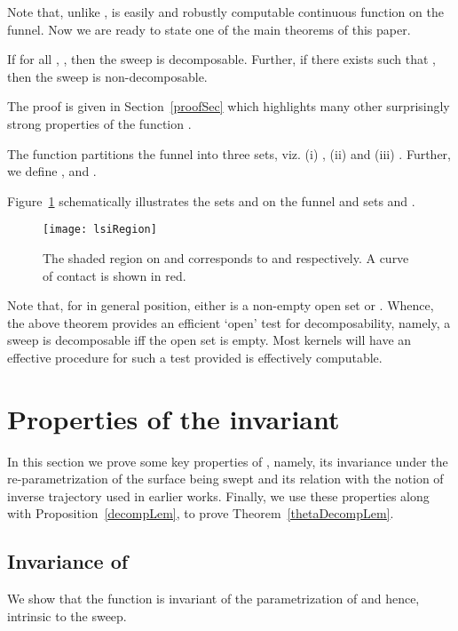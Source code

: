 \documentclass{elsart5p}
\begin{document}
Note that, unlike ,  is easily and robustly computable continuous 
function on the funnel.
Now we are ready to state one of the main theorems of this paper.

\begin{thm} \label{thetaDecompLem}
If for all , , then the sweep is decomposable.  
Further, 
if there exists  such that , then the sweep is 
non-decomposable.
\end{thm}
The proof is given in Section~\ref{proofSec} which highlights
many other surprisingly strong properties of the function .

\begin{defn}
The function  partitions the funnel  into three sets, viz. 
(i) , 
(ii)  and (iii) .  
Further, we define ,  and 
. 
\end{defn}

Figure~\ref{lsiRegionFig} schematically illustrates the sets  and  on the funnel 
and sets  and .

\begin{figure}
 \centering
 \texttt{[image: lsiRegion]}
 \caption{The shaded region on  and  corresponds to  and  respectively.  A 
curve of contact is shown in red.}
 \label{lsiRegionFig}
\end{figure}

Note that, for  in general position, 
either  is a non-empty open set or . 
Whence, the above theorem provides an efficient `open'
test for decomposability, namely, a sweep 
is decomposable iff the open set  is empty. Most kernels
will have an effective procedure for such a test provided  is
effectively computable.

\section{Properties of the invariant }  \label{thetaSec}

In this section we prove some key properties of , namely, its 
invariance under the re-parametrization of the surface being swept and its relation with the notion of 
inverse trajectory used in earlier works. Finally, we use these properties along
with Proposition~\ref{decompLem}, to
prove Theorem~\ref{thetaDecompLem}.


\subsection{Invariance of } \label{thetaInvarSec}
We show that the function  is invariant of the parametrization of  and hence, intrinsic to the sweep. 
\end{document}
